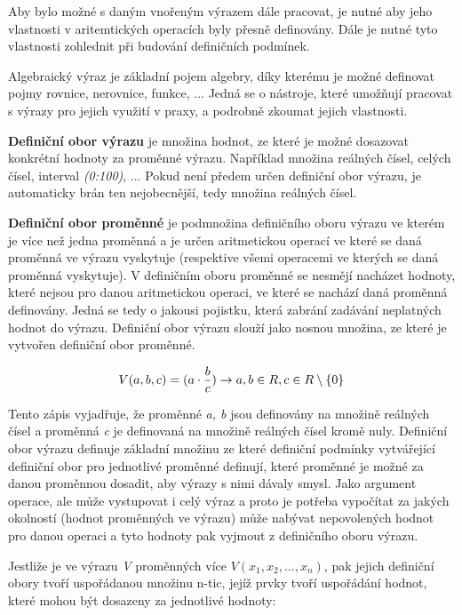 Aby bylo možné s daným vnořeným výrazem dále pracovat, je nutné aby jeho vlastnosti v aritemtických operacích byly přesně definovány. Dále je nutné tyto vlastnosti zohlednit při budování definičních podmínek.

Algebraický výraz je základní pojem algebry, díky kterému je možné definovat pojmy rovnice, nerovnice, funkce, ... Jedná se o nástroje, které umožňují pracovat s výrazy pro jejich využití v praxy, a podrobně zkoumat jejich vlastnosti.


{\bf Definiční obor výrazu} je množina hodnot, ze které je možné dosazovat konkrétní hodnoty za proměnné výrazu. Například množina reálných čísel, celých čísel, interval {\it (0:100)}, ... Pokud není předem určen definiční obor výrazu, je automaticky brán ten nejobecnější, tedy množina reálných čísel.

{\bf Definiční obor proměnné} je podmnožina definičního oboru výrazu ve kterém je více než jedna proměnná a je určen aritmetickou operací ve které se daná proměnná ve výrazu vyskytuje (respektive všemi operacemi ve kterých se daná proměnná vyskytuje).  V definičním oboru proměnné se nesmějí nacházet hodnoty, které nejsou pro danou aritmetickou operaci, ve které se nachází daná proměnná definovány. Jedná se tedy o jakousi pojistku, která zabrání zadávání neplatných hodnot do výrazu. Definiční obor výrazu slouží jako nosnou množina, ze které je vytvořen definiční obor proměnné.

$$ V(a,b,c) =( a \cdot {b \over c}) \rightarrow a, b \in R, c \in R \setminus \left\{0\right\}  $$

Tento zápis vyjadřuje, že proměnné {\it a, b} jsou definovány na množině reálných čísel a proměnná {\it c} je definovaná na množině reálných čísel kromě nuly. Definiční obor výrazu definuje základní množinu ze které definiční podmínky vytvářející definiční obor pro jednotlivé proměnné definují, které proměnné je možné za danou proměnnou dosadit, aby výrazy s nimi dávaly smysl. Jako argument operace, ale může vystupovat i celý výraz a proto je potřeba vypočítat za jakých okolností (hodnot proměnných ve výrazu) může nabývat nepovolených hodnot pro danou operaci a tyto hodnoty pak vyjmout z definičního oboru výrazu.

Jestliže je ve výrazu {\it V} proměnných více $ V(x_1, x_2 , ... , x_n)$, pak jejich definiční obory tvoří uspořádanou množinu n-tic, jejíž prvky tvoří uspořádání hodnot, které mohou být dosazeny za jednotlivé hodnoty:

